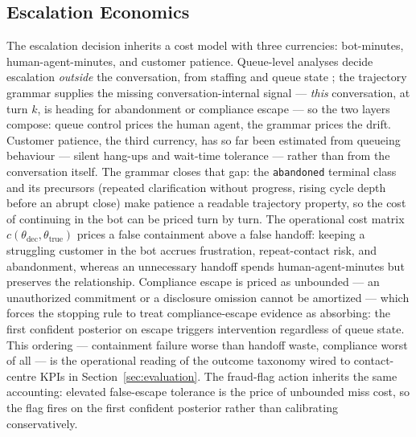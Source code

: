 \subsection{Escalation Economics}
The escalation decision inherits a cost model with three currencies: bot-minutes,
human-agent-minutes, and customer patience.
Queue-level analyses decide escalation \emph{outside} the conversation, from staffing and
queue state \citep{queuecontrol2026}; the trajectory grammar supplies the missing
conversation-internal signal --- \emph{this} conversation, at turn $k$, is heading for
abandonment or compliance escape --- so the two layers compose: queue control prices the
human agent, the grammar prices the drift.
Customer patience, the third currency, has so far been estimated from queueing behaviour ---
silent hang-ups and wait-time tolerance \citep{silentabandonment2024} --- rather than from the
conversation itself.
The grammar closes that gap: the \texttt{abandoned} terminal class and its precursors
(repeated clarification without progress, rising cycle depth before an abrupt close) make
patience a readable trajectory property, so the cost of continuing in the bot can be priced
turn by turn.
The operational cost matrix $c(\theta_{\mathrm{dec}}, \theta_{\mathrm{true}})$ prices a false
containment above a false handoff: keeping a struggling customer in the bot accrues
frustration, repeat-contact risk, and abandonment, whereas an unnecessary handoff spends
human-agent-minutes but preserves the relationship.
Compliance escape is priced as unbounded --- an unauthorized commitment or a disclosure
omission cannot be amortized --- which forces the stopping rule to treat
compliance-escape evidence as absorbing: the first confident posterior on escape triggers
intervention regardless of queue state.
This ordering --- containment failure worse than handoff waste, compliance worst of all ---
is the operational reading of the outcome taxonomy wired to contact-centre KPIs in
Section~\ref{sec:evaluation}.
The fraud-flag action inherits the same accounting: elevated false-escape tolerance is the
price of unbounded miss cost, so the flag fires on the first confident posterior rather than
calibrating conservatively.


